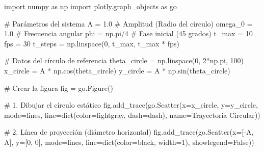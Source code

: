 \documentclass[
  letterpaper,
  DIV=11,
  numbers=noendperiod]{scrreprt}
\newenvironment{Shaded}{\begin{snugshade}}{\end{snugshade}}
\newcommand{\BuiltInTok}[1]{\textcolor[rgb]{0.00,0.23,0.31}{#1}}
\newcommand{\CommentTok}[1]{\textcolor[rgb]{0.37,0.37,0.37}{#1}}
\newcommand{\DecValTok}[1]{\textcolor[rgb]{0.68,0.00,0.00}{#1}}
\newcommand{\FloatTok}[1]{\textcolor[rgb]{0.68,0.00,0.00}{#1}}
\newcommand{\ImportTok}[1]{\textcolor[rgb]{0.00,0.46,0.62}{#1}}
\newcommand{\NormalTok}[1]{\textcolor[rgb]{0.00,0.23,0.31}{#1}}
\newcommand{\OperatorTok}[1]{\textcolor[rgb]{0.37,0.37,0.37}{#1}}
\newcommand{\StringTok}[1]{\textcolor[rgb]{0.13,0.47,0.30}{#1}}
\newcommand{\VariableTok}[1]{\textcolor[rgb]{0.07,0.07,0.07}{#1}}
\begin{document}
\begin{Shaded}
\begin{Highlighting}[]
\ImportTok{import}\NormalTok{ numpy }\ImportTok{as}\NormalTok{ np}
\ImportTok{import}\NormalTok{ plotly.graph\_objects }\ImportTok{as}\NormalTok{ go}

\CommentTok{\# Parámetros del sistema}
\NormalTok{A }\OperatorTok{=} \FloatTok{1.0}          \CommentTok{\# Amplitud (Radio del círculo)}
\NormalTok{omega\_0 }\OperatorTok{=} \FloatTok{1.0}    \CommentTok{\# Frecuencia angular}
\NormalTok{phi }\OperatorTok{=}\NormalTok{ np.pi}\OperatorTok{/}\DecValTok{4}    \CommentTok{\# Fase inicial (45 grados)}
\NormalTok{t\_max }\OperatorTok{=} \DecValTok{10}
\NormalTok{fps }\OperatorTok{=} \DecValTok{30}
\NormalTok{t\_steps }\OperatorTok{=}\NormalTok{ np.linspace(}\DecValTok{0}\NormalTok{, t\_max, t\_max }\OperatorTok{*}\NormalTok{ fps)}

\CommentTok{\# Datos del círculo de referencia}
\NormalTok{theta\_circle }\OperatorTok{=}\NormalTok{ np.linspace(}\DecValTok{0}\NormalTok{, }\DecValTok{2}\OperatorTok{*}\NormalTok{np.pi, }\DecValTok{100}\NormalTok{)}
\NormalTok{x\_circle }\OperatorTok{=}\NormalTok{ A }\OperatorTok{*}\NormalTok{ np.cos(theta\_circle)}
\NormalTok{y\_circle }\OperatorTok{=}\NormalTok{ A }\OperatorTok{*}\NormalTok{ np.sin(theta\_circle)}

\CommentTok{\# Crear la figura}
\NormalTok{fig }\OperatorTok{=}\NormalTok{ go.Figure()}

\CommentTok{\# 1. Dibujar el círculo estático}
\NormalTok{fig.add\_trace(go.Scatter(x}\OperatorTok{=}\NormalTok{x\_circle, y}\OperatorTok{=}\NormalTok{y\_circle, mode}\OperatorTok{=}\StringTok{\textquotesingle{}lines\textquotesingle{}}\NormalTok{, }
\NormalTok{                         line}\OperatorTok{=}\BuiltInTok{dict}\NormalTok{(color}\OperatorTok{=}\StringTok{\textquotesingle{}lightgray\textquotesingle{}}\NormalTok{, dash}\OperatorTok{=}\StringTok{\textquotesingle{}dash\textquotesingle{}}\NormalTok{),}
\NormalTok{                         name}\OperatorTok{=}\StringTok{\textquotesingle{}Trayectoria Circular\textquotesingle{}}\NormalTok{))}

\CommentTok{\# 2. Línea de proyección (diámetro horizontal)}
\NormalTok{fig.add\_trace(go.Scatter(x}\OperatorTok{=}\NormalTok{[}\OperatorTok{{-}}\NormalTok{A, A], y}\OperatorTok{=}\NormalTok{[}\DecValTok{0}\NormalTok{, }\DecValTok{0}\NormalTok{], mode}\OperatorTok{=}\StringTok{\textquotesingle{}lines\textquotesingle{}}\NormalTok{, }
\NormalTok{                         line}\OperatorTok{=}\BuiltInTok{dict}\NormalTok{(color}\OperatorTok{=}\StringTok{\textquotesingle{}black\textquotesingle{}}\NormalTok{, width}\OperatorTok{=}\DecValTok{1}\NormalTok{),}
\NormalTok{                         showlegend}\OperatorTok{=}\VariableTok{False}\NormalTok{))}


\end{Highlighting}
\end{Shaded}
\end{document}
